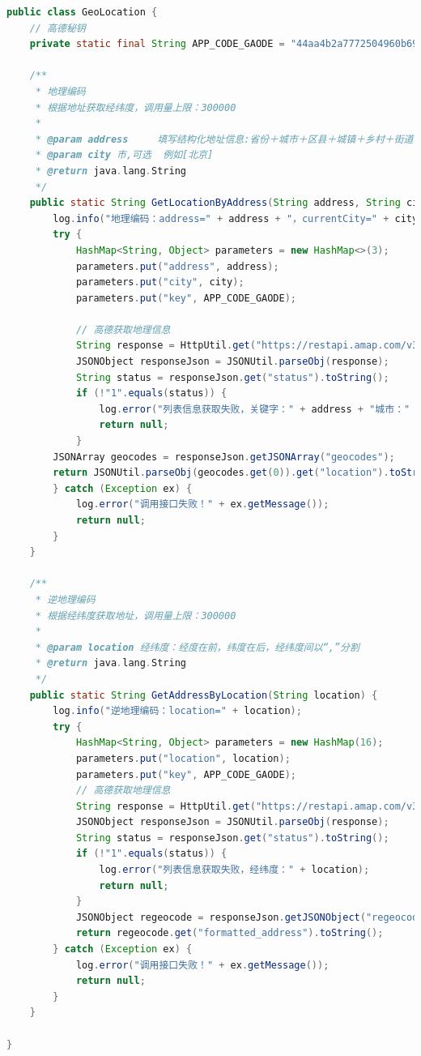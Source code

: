 \begin{lstlisting}[language=Java,title={代码块2: 获取汽车经纬度地理位置}]
  public class GeoLocation {
    // 高德秘钥
    private static final String APP_CODE_GAODE = "44aa4b2a7772504960b691cfb9802";

    /**
     * 地理编码
     * 根据地址获取经纬度，调用量上限：300000
     *
     * @param address     填写结构化地址信息:省份＋城市＋区县＋城镇＋乡村＋街道＋门牌号码 例[北京市朝阳区阜通东大街6号]
     * @param city 市,可选  例如[北京]
     * @return java.lang.String
     */
    public static String GetLocationByAddress(String address, String city) {
        log.info("地理编码：address=" + address + "，currentCity=" + city);
        try {
            HashMap<String, Object> parameters = new HashMap<>(3);
            parameters.put("address", address);
            parameters.put("city", city);
            parameters.put("key", APP_CODE_GAODE);

            // 高德获取地理信息
            String response = HttpUtil.get("https://restapi.amap.com/v3/geocode/geo", parameters);
            JSONObject responseJson = JSONUtil.parseObj(response);
            String status = responseJson.get("status").toString();
            if (!"1".equals(status)) {
                log.error("列表信息获取失败，关键字：" + address + "城市：" + city);
                return null;
            }
        JSONArray geocodes = responseJson.getJSONArray("geocodes");
        return JSONUtil.parseObj(geocodes.get(0)).get("location").toString();
        } catch (Exception ex) {
            log.error("调用接口失败！" + ex.getMessage());
            return null;
        }
    }

    /**
     * 逆地理编码
     * 根据经纬度获取地址，调用量上限：300000
     *
     * @param location 经纬度：经度在前，纬度在后，经纬度间以“,”分割
     * @return java.lang.String
     */
    public static String GetAddressByLocation(String location) {
        log.info("逆地理编码：location=" + location);
        try {
            HashMap<String, Object> parameters = new HashMap(16);
            parameters.put("location", location);
            parameters.put("key", APP_CODE_GAODE);
            // 高德获取地理信息
            String response = HttpUtil.get("https://restapi.amap.com/v3/geocode/regeo", parameters);
            JSONObject responseJson = JSONUtil.parseObj(response);
            String status = responseJson.get("status").toString();
            if (!"1".equals(status)) {
                log.error("列表信息获取失败，经纬度：" + location);
                return null;
            }
            JSONObject regeocode = responseJson.getJSONObject("regeocode");
            return regeocode.get("formatted_address").toString();
        } catch (Exception ex) {
            log.error("调用接口失败！" + ex.getMessage());
            return null;
        }
    }

}
  \end{lstlisting}
